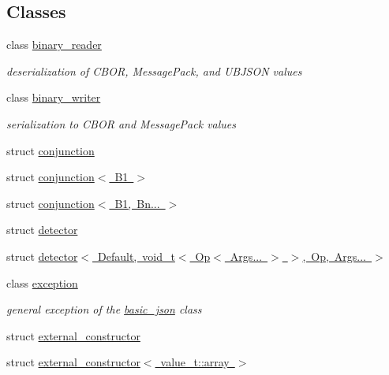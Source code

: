 \subsection*{Classes}
\begin{DoxyCompactItemize}
\item 
class \mbox{\hyperlink{classnlohmann_1_1detail_1_1binary__reader}{binary\+\_\+reader}}
\begin{DoxyCompactList}\small\item\em deserialization of C\+B\+OR, Message\+Pack, and U\+B\+J\+S\+ON values \end{DoxyCompactList}\item 
class \mbox{\hyperlink{classnlohmann_1_1detail_1_1binary__writer}{binary\+\_\+writer}}
\begin{DoxyCompactList}\small\item\em serialization to C\+B\+OR and Message\+Pack values \end{DoxyCompactList}\item 
struct \mbox{\hyperlink{structnlohmann_1_1detail_1_1conjunction}{conjunction}}
\item 
struct \mbox{\hyperlink{structnlohmann_1_1detail_1_1conjunction_3_01B1_01_4}{conjunction$<$ B1 $>$}}
\item 
struct \mbox{\hyperlink{structnlohmann_1_1detail_1_1conjunction_3_01B1_00_01Bn_8_8_8_01_4}{conjunction$<$ B1, Bn... $>$}}
\item 
struct \mbox{\hyperlink{structnlohmann_1_1detail_1_1detector}{detector}}
\item 
struct \mbox{\hyperlink{structnlohmann_1_1detail_1_1detector_3_01Default_00_01void__t_3_01Op_3_01Args_8_8_8_01_4_01_4_00_01Op_00_01Args_8_8_8_01_4}{detector$<$ Default, void\+\_\+t$<$ Op$<$ Args... $>$ $>$, Op, Args... $>$}}
\item 
class \mbox{\hyperlink{classnlohmann_1_1detail_1_1exception}{exception}}
\begin{DoxyCompactList}\small\item\em general exception of the \mbox{\hyperlink{classnlohmann_1_1basic__json}{basic\+\_\+json}} class \end{DoxyCompactList}\item 
struct \mbox{\hyperlink{structnlohmann_1_1detail_1_1external__constructor}{external\+\_\+constructor}}
\item 
struct \mbox{\hyperlink{structnlohmann_1_1detail_1_1external__constructor_3_01value__t_1_1array_01_4}{external\+\_\+constructor$<$ value\+\_\+t\+::array $>$}}
\item 

\end{DoxyCompactItemize}
